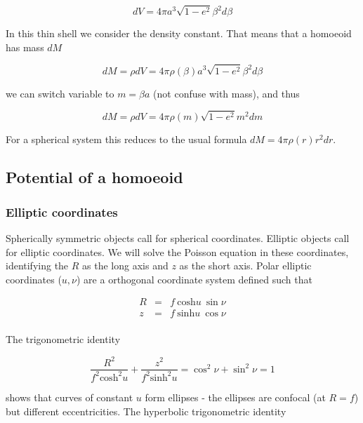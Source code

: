 \begin{equation}
dV = 4\pi a^3 \sqrt{1-e^2} \beta^2 d\beta 
\end{equation}

In this thin shell we consider the density constant. That means that a homoeoid has mass $dM$

\begin{equation}
dM = \rho dV = 4\pi \rho(\beta) a^3 \sqrt{1-e^2} \beta^2 d\beta 
\end{equation}

we can switch variable to $m = \beta a $ (not confuse with mass), and thus 

\begin{equation}
dM = \rho dV = 4\pi \rho(m) \sqrt{1-e^2} m^2 dm 
\end{equation}

For a spherical system this reduces to the usual formula $dM = 4\pi \rho(r)  r^2 dr$.


\subsection{Potential of a homoeoid}


\subsubsection{Elliptic coordinates}

Spherically symmetric objects call for spherical coordinates. Elliptic objects call for elliptic coordinates. We will solve the Poisson equation in these coordinates, identifying the $R$ as the long axis and $z$ as the short axis. Polar elliptic coordinates ($u,\nu$) are a orthogonal coordinate system defined such that 

\begin{eqnarray}
R &=& f \ \mathrm{cosh} u  \ \sin \nu\\
z &=& f \  \mathrm{sinh} u  \ \cos \nu\\
\end{eqnarray}


The trigonometric identity 

\begin{equation}
\frac{R^2}{f^2\mathrm{cosh}^2 u} + \frac{z^2}{f^2\mathrm{sinh}^2 u} = \cos^2\nu + \sin^2\nu = 1
\end{equation}


shows that curves of constant $u$ form ellipses - the ellipses are confocal (at $R=f$) but different eccentricities. The hyperbolic trigonometric identity

